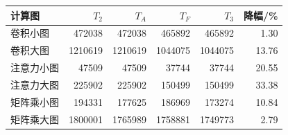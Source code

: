 \begin{tabular}{lrrrrr}\toprule
计算图 & $T_2$ & $T_A$ & $T_F$ & $T_3$ & 降幅/\%\\\midrule
卷积小图 & 472038 & 472038 & 465892 & 465892 & 1.30\\
卷积大图 & 1210619 & 1210619 & 1044075 & 1044075 & 13.76\\
注意力小图 & 47509 & 47509 & 37744 & 37744 & 20.55\\
注意力大图 & 225902 & 225902 & 150499 & 150499 & 33.38\\
矩阵乘小图 & 194331 & 177625 & 186969 & 173274 & 10.84\\
矩阵乘大图 & 1800001 & 1765989 & 1758881 & 1749773 & 2.79\\
\bottomrule\end{tabular}
